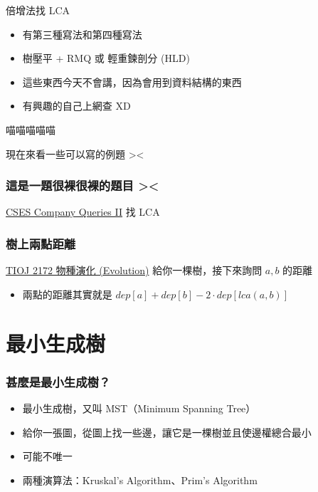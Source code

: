 \documentclass[aspectratio=169]{beamer}
\begin{document}
    \begin{frame}{倍增法找 LCA}
        \begin{itemize}
            \item 有第三種寫法和第四種寫法
            \item<2-> 樹壓平 + RMQ 或 輕重鍊剖分 (HLD)
            \item<2-> 這些東西今天不會講，因為會用到資料結構的東西
            \item<2-> 有興趣的自己上網查 XD
        \end{itemize}
    \end{frame}
    \begin{frame}{喵喵喵喵喵}
        \begin{center}
            現在來看一些可以寫的例題 ><
        \end{center}
    \end{frame}
    
    \begin{frame}
        \frametitle{這是一題很裸很裸的題目 ><}
        \begin{block}{\href{https://cses.fi/problemset/task/1688/}{CSES Company Queries II}}
        找 LCA
        \end{block}
    \end{frame}
    
    \begin{frame}
        \frametitle{樹上兩點距離}
        \begin{block}{\href{https://tioj.ck.tp.edu.tw/problems/2172}{TIOJ 2172 物種演化 (Evolution)}}
        給你一棵樹，接下來詢問 $a,b$ 的距離
        \end{block}
        
        \begin{itemize}
            \item<2-> 兩點的距離其實就是 $dep[a] + dep[b] - 2 \cdot dep[lca(a,b)]$
        \end{itemize}
    \end{frame}
    \section{最小生成樹}
    \begin{frame}
        \frametitle{甚麼是最小生成樹？}
        \begin{itemize}
            \item 最小生成樹，又叫 MST（Minimum Spanning Tree）
            \item 給你一張圖，從圖上找一些邊，讓它是一棵樹並且使邊權總合最小
            \item 可能不唯一
            \item 兩種演算法：Kruskal's Algorithm、Prim's Algorithm
        \end{itemize}
    \end{frame}
    
\end{document}
